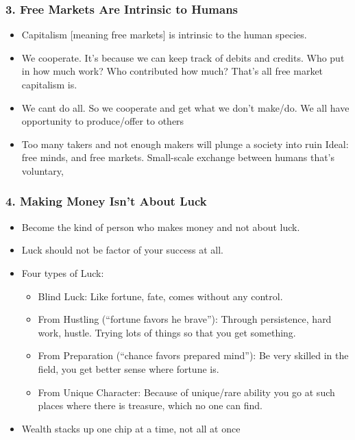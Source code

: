 \begin{frame}[fragile]
\frametitle{3. Free Markets Are Intrinsic to Humans}
\begin{itemize}
\item Capitalism [meaning free markets] is intrinsic to the human species. 
\item We cooperate. It’s because we can keep track of debits and credits. Who put in how much work? Who contributed how much? That’s all free market capitalism is.
\item We cant do all. So we cooperate and get what we don't make/do. We all have opportunity to produce/offer to others
\item Too many takers and not enough makers will plunge a society into ruin
\iteam Ideal: free minds, and free markets. Small-scale exchange between humans that's voluntary,
\end{itemize}
\end{frame}

\begin{frame}[fragile]
\frametitle{4. Making Money Isn't About Luck}
\begin{itemize}
\item Become the kind of person who makes money and not about luck.
\item Luck should not be factor of your success at all.
\item Four types of Luck:
\begin{itemize}
\item Blind Luck: Like fortune, fate, comes without any control.
\item From Hustling (``fortune favors he brave''): Through persistence, hard work, hustle. Trying lots of things so that you get something.
\item From Preparation (``chance favors prepared mind''): Be very skilled in the field, you get better sense where fortune is.
\item From Unique Character: Because of unique/rare ability you go at such places where there is treasure, which no one can find.
\end{itemize}
\item Wealth stacks up one chip at a time, not all at once

\end{itemize}
\end{frame}

